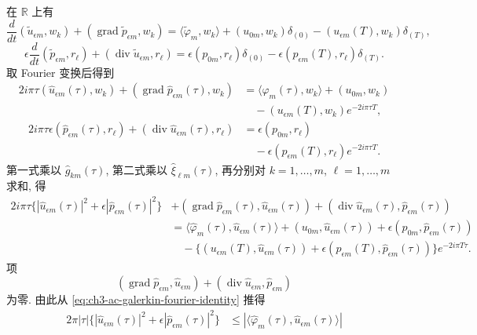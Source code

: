 \begin{Proof}
\hypertarget{chapter-03-page-308}{}
在 $\mathbb R$ 上有
\[
\frac d{dt}(\widetilde u_{\epsilon m},w_k)
+(\operatorname{grad}\widetilde p_{\epsilon m},w_k)
=\langle\widetilde\varphi_m,w_k\rangle
+(u_{0m},w_k)\delta_{(0)}
-(u_{\epsilon m}(T),w_k)\delta_{(T)},
\]
\[
\epsilon\frac d{dt}(\widetilde p_{\epsilon m},r_\ell)
+(\operatorname{div}\widetilde u_{\epsilon m},r_\ell)
=\epsilon(p_{0m},r_\ell)\delta_{(0)}
-\epsilon(p_{\epsilon m}(T),r_\ell)\delta_{(T)}.
\]
取 Fourier 变换后得到
\[
\begin{aligned}
2i\pi\tau(\widehat u_{\epsilon m}(\tau),w_k)
+(\operatorname{grad}\widehat p_{\epsilon m}(\tau),w_k)
&=\langle\widehat\varphi_m(\tau),w_k\rangle
+(u_{0m},w_k)\\
&\quad-(u_{\epsilon m}(T),w_k)e^{-2i\pi\tau T},
\end{aligned}
\]
\[
\begin{aligned}
2i\pi\tau\epsilon(\widehat p_{\epsilon m}(\tau),r_\ell)
+(\operatorname{div}\widehat u_{\epsilon m}(\tau),r_\ell)
&=\epsilon(p_{0m},r_\ell)\\
&\quad-\epsilon(p_{\epsilon m}(T),r_\ell)e^{-2i\pi\tau T}.
\end{aligned}
\]
第一式乘以 $\widehat g_{km}(\tau)$, 第二式乘以 $\widehat\xi_{\ell m}(\tau)$, 再分别对 $k=1,\ldots,m$, $\ell=1,\ldots,m$ 求和, 得
\begin{equation}
\begin{aligned}
2i\pi\tau\{|\widehat u_{\epsilon m}(\tau)|^2
+\epsilon|\widehat p_{\epsilon m}(\tau)|^2\}
&+(\operatorname{grad}\widehat p_{\epsilon m}(\tau),\widehat u_{\epsilon m}(\tau))
+(\operatorname{div}\widehat u_{\epsilon m}(\tau),\widehat p_{\epsilon m}(\tau))\\
&=\langle\widehat\varphi_m(\tau),\widehat u_{\epsilon m}(\tau)\rangle
+(u_{0m},\widehat u_{\epsilon m}(\tau))
+\epsilon(p_{0m},\widehat p_{\epsilon m}(\tau))\\
&\quad-\{(u_{\epsilon m}(T),\widehat u_{\epsilon m}(\tau))
+\epsilon(p_{\epsilon m}(T),\widehat p_{\epsilon m}(\tau))\}e^{-2i\pi T\tau}.
\end{aligned}
\label{eq:ch3-ac-galerkin-fourier-identity}
\end{equation}
项
\[
(\operatorname{grad}\widehat p_{\epsilon m},\widehat u_{\epsilon m})
+(\operatorname{div}\widehat u_{\epsilon m},\widehat p_{\epsilon m})
\]
为零. 由此从 \eqref{eq:ch3-ac-galerkin-fourier-identity} 推得
\[
\begin{aligned}
2\pi|\tau|\{|\widehat u_{\epsilon m}(\tau)|^2
+\epsilon|\widehat p_{\epsilon m}(\tau)|^2\}
&\leq|\langle\widehat\varphi_m(\tau),\widehat u_{\epsilon m}(\tau)\rangle|

\end{aligned}\]
\end{Proof}
